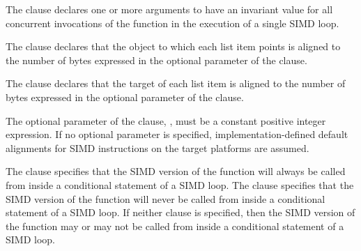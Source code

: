 The  clause declares one or more arguments to have an invariant 
value for all concurrent invocations of the function in the execution of a 
single SIMD loop.

\begin{samepage}
\begin{ccppspecific}
The  clause declares that the object to which each list item 
points is aligned to the number of bytes expressed in the optional parameter 
of the  clause.
\end{ccppspecific}
\end{samepage}

\begin{fortranspecific}
The  clause declares that the target of each list item is aligned to 
the number of bytes expressed in the optional parameter of the  clause.
\end{fortranspecific}

The optional parameter of the  clause, , must be 
a constant positive integer expression. If no optional parameter is specified, 
implementation-defined default alignments for SIMD instructions on the target 
platforms are assumed.

The  clause specifies that the SIMD version of the function will 
always be called from inside a conditional statement of a SIMD loop. The 
 clause specifies that the SIMD version of the function will 
never be called from inside a conditional statement of a SIMD loop. If neither 
clause is specified, then the SIMD version of the function may or may not be 
called from inside a conditional statement of a SIMD loop.

